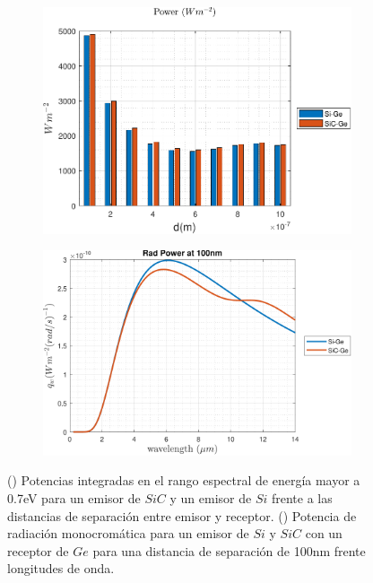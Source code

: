 \begin{figure}[H]
	\centering
	\begin{subfigure}[b]{0.49\textwidth}
		\centering
		\includegraphics[width=1.00\textwidth]{SiCvsSi.pdf}
		\caption{ }
		\label{fig:Prad_SiCGe}
	\end{subfigure}
	\hfill
	\begin{subfigure}[b]{0.49\textwidth}
		\centering
		\includegraphics[width=1.00\textwidth]{SiCvsSi_rad.pdf}
		\caption{ }
		\label{fig:rad_SiCGe}
	\end{subfigure}
	\caption{() Potencias integradas en el rango espectral de energía mayor a 0.7eV para un emisor de $SiC$ y un emisor de $Si$ frente a las distancias de separación entre emisor y receptor. () Potencia de radiación monocromática para un emisor de $Si$ y $SiC$ con un receptor de $Ge$ para una distancia de separación de 100nm frente longitudes de onda.}
	\label{fig:rads_SiCGe}
\end{figure}

